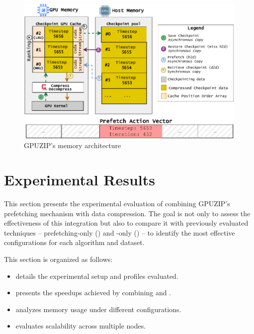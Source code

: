 \documentclass[Ingles,Final]{ic-tese-v3}
\begin{document}
\begin{figure}[]
  \centering
  \includegraphics[width=1\linewidth,trim={0 0 0 0},clip]{figures/arch_gpuzip.pdf}
  \caption[Memory architecture diagram (\checkpointprefetching + \compression)]{GPUZIP's memory architecture}
  \label{fig:arch_gpuzip}
\end{figure}

\section{Experimental Results}
\label{sec:comppref_results}

This section presents the experimental evaluation of combining GPUZIP’s prefetching mechanism with data compression. The goal is not only to assess the effectiveness of this integration but also to compare it with previously evaluated techniques -- prefetching-only () and \compression-only () -- to identify the most effective configurations for each \checkpointing algorithm and dataset.

This section is organized as follows:
\begin{itemize}
    \item {} details the experimental setup and profiles evaluated.
    \item {} presents the speedups achieved by combining \prefetching and \compression.
    \item {} analyzes memory usage under different configurations.
    \item {} evaluates scalability across multiple nodes.
\end{itemize}
\end{document}

